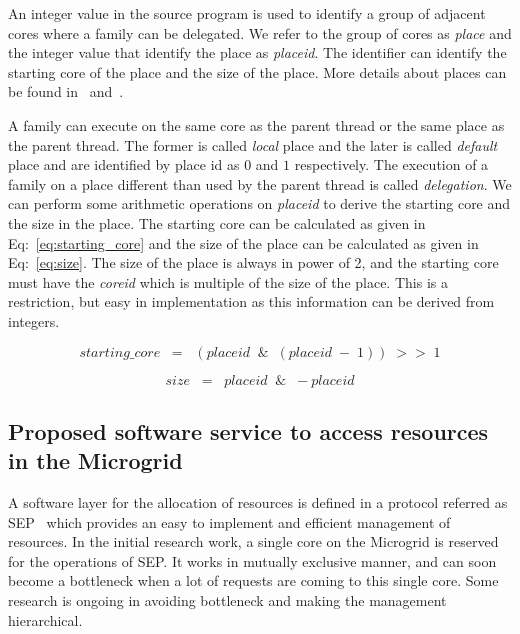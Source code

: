 \documentclass{article}
\begin{document}
An integer value in the source program is used to identify a group of adjacent
cores where a family can be delegated. We refer to the group of cores as
\emph{place} and the integer value that identify the place as \emph{placeid}.
The identifier can identify the starting core of the place and the size of the
place. More details about places can be found in~\cite{place_mgsim,poss.12.sl}
and~\cite[Chap.~11 \& App.~E]{poss.12}.

A family can execute on the same core as the parent thread or the same place as
the parent thread. The former is called \emph{local} place and the later is
called \emph{default} place and are identified by place id as $0$ and $1$
respectively. The execution of a family on a place different than used by the
parent thread is called \emph{delegation}. We can perform some arithmetic
operations on \emph{placeid} to derive the starting core and the size in the
place. The starting core can be calculated as given in
Eq:~\ref{eq:starting_core} and the size of the place can be calculated as given
in Eq:~\ref{eq:size}. The size of the place is always in power of 2, and the
starting core must have the \emph{coreid} which is multiple of the size of
the place. This is a restriction, but easy in implementation as this
information can be derived from integers.

\begin{equation}
\label{eq:starting_core}
starting\_core \;\;=\;\; (placeid\;\; \&\;\; (placeid\; -\; 1))\; >>\; 1
\end{equation}

\begin{equation}
\label{eq:size}
size \;\;=\;\; placeid\;\; \&\;\; -placeid
\end{equation}

\subsection{Proposed software service to access resources in the
Microgrid}

A software layer for the allocation of resources is defined in a protocol
referred as SEP~\cite{SEP,sl16} which provides an easy to implement and
efficient management of resources. In the initial research work, a single core
on the Microgrid is reserved for the operations of SEP. It works in mutually
exclusive manner, and can soon become a bottleneck when a lot of requests are
coming to this single core. Some research is ongoing in avoiding bottleneck and
making the management hierarchical.
\end{document}
